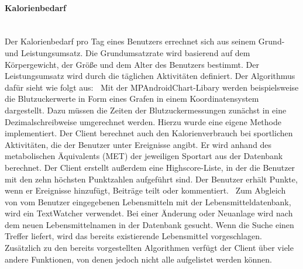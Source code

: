 	\paragraph{Kalorienbedarf}$~$ \\
	Der Kalorienbedarf pro Tag eines Benutzers errechnet sich aus seinem Grund- und Leistungsumsatz. Die Grundumsatzrate wird basierend auf dem Körpergewicht, der Größe und dem Alter des Benutzers bestimmt. Der Leistungsumsatz wird durch die täglichen Aktivitäten definiert. Der Algorithmus dafür sieht wie folgt aus: 
	$~$ \newline
	Mit der MPAndroidChart-Libary werden beispielsweise die Blutzuckerwerte in Form eines Grafen in einem Koordinatensystem dargestellt. Dazu müssen die Zeiten der Blutzuckermessungen zunächst in eine Dezimalschreibweise umgerechnet werden. Hierzu wurde eine eigene Methode implementiert.\newline
	Der Client berechnet auch den Kalorienverbrauch bei sportlichen Aktivitäten, die der Benutzer unter \glqq Ereignisse\grqq{} angibt. Er wird anhand des metabolischen Äquivalents (MET) der jeweiligen Sportart aus der Datenbank berechnet.\newline
	Der Client erstellt außerdem eine Highscore-Liste, in der die Benutzer mit den zehn höchsten Punktzahlen aufgeführt sind. Der Benutzer erhält Punkte, wenn er Ereignisse hinzufügt, Beiträge teilt oder kommentiert.  \newline
	Zum Abgleich von vom Benutzer eingegebenen Lebensmitteln mit der Lebensmitteldatenbank, wird ein TextWatcher verwendet. Bei einer Änderung oder Neuanlage wird nach dem neuen Lebensmittelnamen in der Datenbank gesucht. Wenn die Suche einen Treffer liefert, wird das bereits existierende Lebensmittel vorgeschlagen.\newline
	Zusätzlich zu den bereits vorgestellten Algorithmen verfügt der Client über viele andere Funktionen, von denen jedoch nicht alle aufgelistet werden können. 
